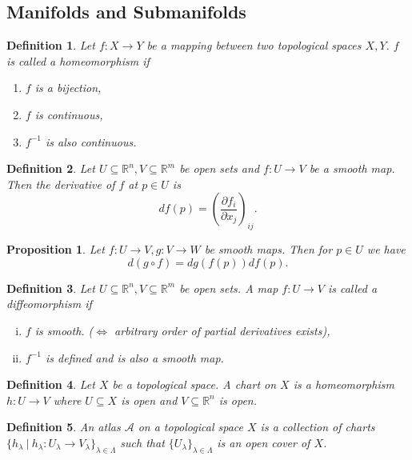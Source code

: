 \documentclass{article}
\newtheorem{proposition}{Proposition}[section]
\newtheorem{definition}{Definition}[section]
\numberwithin{equation}{section}
\begin{document}
\subsection{Manifolds and Submanifolds}

\begin{definition}
Let $f:X\to Y$ be a mapping between two topological spaces $X,Y$. $f$ is called a homeomorphism if 
\begin{enumerate}
\item $f$ is a bijection,
\item $f$ is continuous,
\item $f^{-1}$ is also continuous.
\end{enumerate}
\end{definition}

\begin{definition}
Let $U\subseteq\mathbb{R}^n,V\subseteq\mathbb{R}^m$ be open sets and $f:U\to V$ be a smooth map. Then the derivative of $f$ at $p\in U$ is 
\begin{equation*}
df(p) = \left({\frac {\partial f_i} {\partial x_j}}\right)_{ij}.
\end{equation*}
\end{definition}

\begin{proposition}
Let $f:U\to V, g:V\to W$ be smooth maps. Then for $p\in U$ we have
\begin{equation*}
d(g\circ f) = dg(f(p))df(p).
\end{equation*}
\end{proposition}

\begin{definition}
Let $U\subseteq\mathbb{R}^n,V\subseteq\mathbb{R}^m$ be open sets. A map $f:U\to V$ is called a diffeomorphism if 
\begin{enumerate}[i).]
\item $f$ is smooth. ($\Leftrightarrow$ arbitrary order of partial derivatives exists),
\item $f^{-1}$ is defined and is also a smooth map.
\end{enumerate}
\end{definition}

\begin{definition}
Let $X$ be a topological space. A chart on $X$ is a homeomorphism $h:U\to V$ where $U\subseteq X$ is open and $V\subseteq \mathbb{R}^n$ is open.
\end{definition}

\begin{definition}
An atlas $\mathcal{A}$ on a topological space $X$ is a collection of charts $\{h_\lambda\:|\: h_\lambda:U_\lambda\to V_\lambda\}_{\lambda\in \Lambda}$ such that
$\{U_\lambda\}_{\lambda\in\Lambda}$ is an open cover of $X$.
\end{definition}
\end{document}

